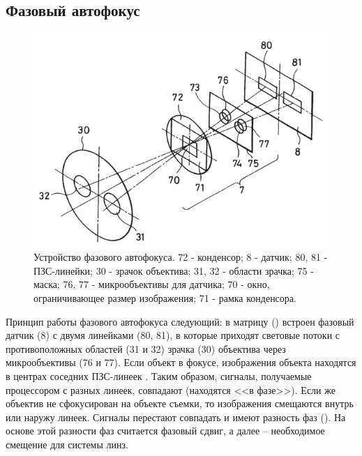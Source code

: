 \subsection{Фазовый автофокус} %
\begin{figure}[ht!] 
	\center
	\includegraphics [scale=1] {my_folder/images/phase_focus_detecror.png}
	\caption{Устройство фазового автофокуса. 72 - конденсор; 8 - датчик; 80, 81 - ПЗС-линейки; 30 - зрачок объектива; 31, 32 - области зрачка; 75 - маска; 76, 77 - микрообъективы для датчика; 70 - окно, ограничивающее размер изображения; 71 - рамка конденсора.}
	\label{fig:pdaf}
\end{figure}

Принцип работы фазового автофокуса следующий: в матрицу () встроен фазовый датчик (8) с двумя линейками (80, 81), в которые приходят световые потоки с противоположных областей (31 и 32) зрачка (30) объектива через микрообъективы (76 и 77). Если объект в фокусе,  изображения объекта находятся в центрах соседних ПЗС-линеек \cite{носов1986основы}. Таким образом, сигналы, получаемые процессором с разных линеек, совпадают (находятся <<в фазе>>). Если же объектив не сфокусирован на объекте съемки, то изображения смещаются внутрь или наружу линеек. Сигналы перестают совпадать и имеют разность фаз (). На основе этой разности фаз считается фазовый сдвиг, а далее -- необходимое смещение для системы линз.

